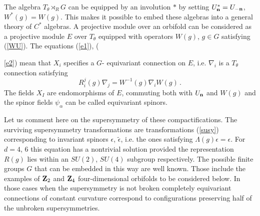 \documentclass[a4paper,a4paper]{article}
\begin{document}
The algebra $T_{\theta}\rtimes_{R} G$ can be equipped by an involution $*$ by setting 
$U_{\bf n}^{*} = U_{-{\bf n}}$, $W^{*}(g) = W(g)$. This makes it possible to embed these algebras 
into a general theory of $C^{*}$ algebras. 
A projective module over  an orbifold can be considered as a projective module $E$
over $T_{\theta}$ equipped with operators $W(g)$, $g\in G$ satisfying (\ref{WU}).
The equations (\ref{e1}), ({\ref{e2})  mean that $X_{i}$ specifies
a $G$- equivariant connection  on $E$, i.e. $\nabla_{i}$ is  a $T_{\theta}$ connection  satisfying 
\begin{equation}\label{eqcon}
R_{i}^{j}(g)\nabla_{j} = W^{-1}(g)\nabla_{i}W(g) \, .
\end{equation}
The fields $X_{I}$ are endomorphisms of $E$, commuting both with $U_{\bf n}$ and $W(g)$ and the spinor fields 
 $\psi_{\alpha}$ can be called equivariant spinors.     


Let us comment here  on the supersymmetry of these compactifications. 
The surviving supersymmetry transformations are transformations (\ref{susy}) corresponding 
to invariant spinors $\epsilon$, $\tilde \epsilon$, i.e. the ones satisfying 
$\Lambda(g)\epsilon = \epsilon$. For $d=4$, $6$  this equation has a nontrivial solution 
provided the representation $R(g)$  lies  within  an $SU(2)$, $SU(4)$ subgroup respectively.
 The possible finite groups $G$ that can 
be embedded in this way are well known. Those include the examples of ${\bf Z}_{2}$ and 
${\bf Z}_{4}$ four-dimensional orbifolds to be considered below. In those cases when the 
supersymmetry is not broken completely  equivariant connections of constant curvature 
correspond to configurations preserving half of the unbroken supersymmetries.  



}
\end{document}
